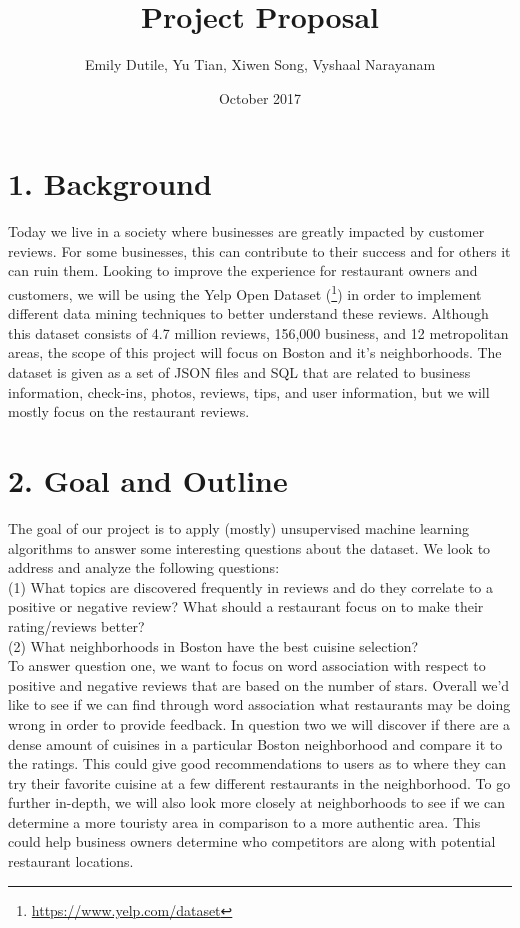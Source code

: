 \documentclass{neu_handout}
\title{Project Proposal}
\author{Emily Dutile, Yu Tian, Xiwen Song, Vyshaal Narayanam}
\date{October 2017}
\begin{document}
\section*{1. Background}
Today we live in a society where businesses are greatly impacted by customer reviews. For some businesses, this can contribute to their success and for others it can ruin them. Looking to improve the experience for restaurant owners and customers, we will be using the Yelp Open Dataset (\footnote{\url{https://www.yelp.com/dataset}}) in order to implement different data mining techniques to better understand these reviews. Although this dataset consists of 4.7 million reviews, 156,000 business, and 12 metropolitan areas, the scope of this project will focus on Boston and it's neighborhoods. The dataset is given as a set of JSON files and SQL that are related to business information, check-ins, photos, reviews, tips, and user information, but we will mostly focus on the restaurant reviews.

\section*{2. Goal and Outline}
The goal of our project is to apply (mostly) unsupervised machine learning algorithms to answer some interesting questions about the dataset. We look to address and analyze the following questions: \\
(1) What topics are discovered frequently in reviews and do they correlate to a positive or negative review? What should a restaurant focus on to make their rating/reviews better? \\
(2) What neighborhoods in Boston have the best cuisine selection? \\

To answer question one, we want to focus on word association with respect to positive and negative reviews that are based on the number of stars. Overall we'd like to see if we can find through word association what restaurants may be doing wrong in order to provide feedback. In question two we will discover if there are a dense amount of cuisines in a particular Boston neighborhood and compare it to the ratings. This could give good recommendations to users as to where they can try their favorite cuisine at a few different restaurants in the neighborhood. To go further in-depth, we will also look more closely at neighborhoods to see if we can determine a more touristy area in comparison to a more authentic area. This could help business owners determine who competitors are along with potential restaurant locations.
\end{document}
